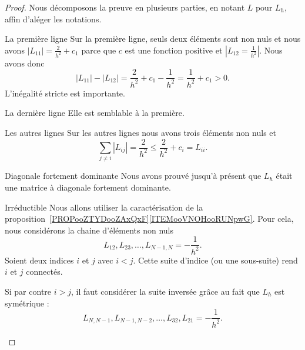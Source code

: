 \begin{proof}
    Nous décomposons la preuve en plusieurs parties, en notant \( L\) pour \( L_h\), affin d'aléger les notations.
    \begin{subproof}
        \item[La première ligne]
            Sur la première ligne, seuls deux éléments sont non nuls et nous avons \( | L_{11} |=\frac{ 2 }{ h^2 }+c_1\) parce que \( c\) est une fonction positive et \( | L_{12}=\frac{1}{ h^2 } |\). Nous avons donc
        \begin{equation}
            | L_{11} |-| L_{12} |=\frac{ 2 }{ h^2 }+c_1-\frac{1}{ h^2 }=\frac{1}{ h^2 }+c_1>0.
        \end{equation}
        L'inégalité stricte est importante.

        \item[La dernière ligne]
        Elle est semblable à la première.

        \item[Les autres lignes]
        Sur les autres lignes nous avons trois éléments non nuls et
        \begin{equation}
            \sum_{j\neq i}| L_{ij} |=\frac{ 2 }{ h^2 }\leq \frac{ 2 }{ h^2 }+c_i=L_{ii}.
        \end{equation}

        \item[Diagonale fortement dominante]
        Nous avons prouvé jusqu'à présent que \( L_h\) était une matrice à diagonale fortement dominante.

        \item[Irréductible]
        Nous allons utiliser la caractérisation de la proposition~\ref{PROPooZTYDooZAxQxF}\ref{ITEMooVNOHooRUNpwG}. Pour cela, nous considérons la chaine d'éléments non nuls
        \begin{equation}
            L_{12}, L_{23},\ldots, L_{N-1,N}=-\frac{1}{ h^2 }.
        \end{equation}
        Soient deux indices \( i\) et \( j\) avec \( i<j\). Cette suite d'indice (ou une sous-suite) rend \( i\) et \( j\) connectés.

        Si par contre \( i>j\), il faut considérer la suite inversée grâce au fait que \( L_h\) est symétrique :
        \begin{equation}
            L_{N,N-1},L_{N-1,N-2},\ldots, L_{32}, L_{21}=-\frac{ 1 }{ h^2 }.
        \end{equation}
    \end{subproof}
\end{proof}

